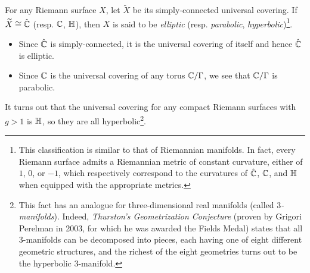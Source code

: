 \documentclass[../Moduli_Spaces_of_Riemann_Surfaces.tex]{subfiles}
\begin{document}
    \begin{remark}
        For any Riemann surface $X$, let $\widetilde{X}$ be its simply-connected universal covering. If $\widetilde{X}\cong\hat{\mathbb{C}}$ (resp. $\mathbb{C}$, $\mathbb{H}$), then $X$ is said to be \textit{elliptic} (resp. \textit{parabolic}, \textit{hyperbolic})\footnote{This classification is similar to that of Riemannian manifolds. In fact, every Riemann surface admits a Riemannian metric of constant curvature, either of $1$, $0$, or $-1$, which respectively correspond to the curvatures of $\hat{\mathbb{C}}$, $\mathbb{C}$, and $\mathbb{H}$ when equipped with the appropriate metrics.}.
        \begin{itemize}
            \item Since $\hat{\mathbb{C}}$ is simply-connected, it is the universal covering of itself and hence $\hat{\mathbb{C}}$ is elliptic.
                \vspace{-0.05in}
            \item Since $\mathbb{C}$ is the universal covering of any torus $\mathbb{C}/\Gamma$, we see that $\mathbb{C}/\Gamma$ is parabolic.
        \end{itemize}
        It turns out that the universal covering for any compact Riemann surfaces with $g>1$ is $\mathbb{H}$, so they are all hyperbolic\footnote{This fact has an analogue for three-dimensional real manifolds (called \textit{$3$-manifolds}). Indeed, \textit{Thurston's Geometrization Conjecture} (proven by Grigori Perelman in 2003, for which he was awarded the Fields Medal) states that all $3$-manifolds can be decomposed into pieces, each having one of eight different geometric structures, and the richest of the eight geometries turns out to be the hyperbolic $3$-manifold.}.\exqed
    \end{remark}
\end{document}

